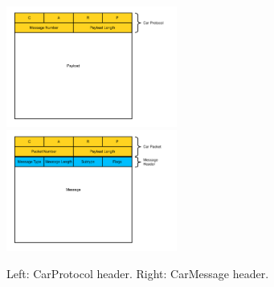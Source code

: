 \begin{figure}[ht]
	\includegraphics[width=0.5\textwidth]{figures/prot0.pdf}
	\includegraphics[width=0.5\textwidth]{figures/prot1.pdf}
	\caption{Left: CarProtocol header. Right: CarMessage header.} \label{CarProtocol}
\end{figure}

